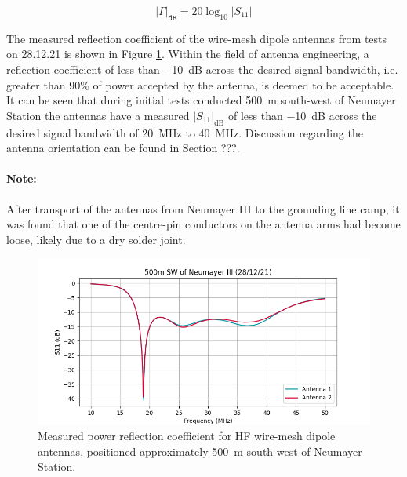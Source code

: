 \documentclass[a4paper,12pt]{article}
\begin{document}
\begin{equation}
  \left|\Gamma\right|_{\texttt{dB}} = 20\log_{10} \left|S_{11}\right|
\end{equation}

The measured reflection coefficient of the wire-mesh dipole antennas from tests
on 28.12.21 is shown in Figure \ref{FigureWireMeshNeumayer}.  Within the field
of antenna engineering, a reflection coefficient of less than
\SI{-10}{\deci\bel} across the desired signal bandwidth, i.e. greater than 90\%
of power accepted by the antenna, is deemed to be acceptable.  It can be seen
that during initial tests conducted \SI{500}{\metre} south-west of Neumayer
Station the antennas have a measured $\left|S_{11}\right|_{\textrm{dB}}$ of less
than \SI{-10}{\deci\bel} across the desired signal bandwidth of
\SI{20}{\mega\hertz} to \SI{40}{\mega\hertz}.  Discussion regarding the antenna
orientation can be found in Section ???.

\paragraph*{Note:} After transport of the antennas from Neumayer III to the
grounding line camp, it was found that one of the centre-pin conductors on the
antenna arms had become loose, likely due to a dry solder joint.

\begin{figure}[htbp]
  \centering
  \includegraphics[width=\textwidth]{Figures/ApRES/Rover/HF/antenna_comparison_s11.png}
  \caption{
    Measured power reflection coefficient for HF wire-mesh dipole antennas, 
    positioned approximately \SI{500}{\metre} south-west of Neumayer Station.
  }
  \label{FigureWireMeshNeumayer}
\end{figure}
\end{document}
